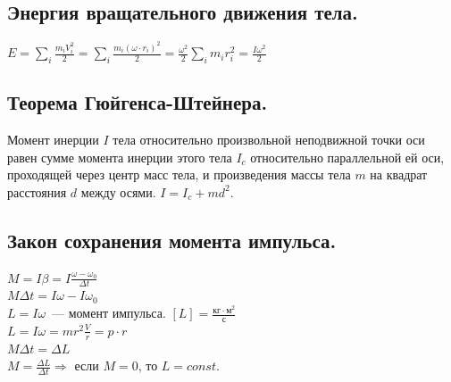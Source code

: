 \documentclass{article}
\begin{document}
	\subsection{Энергия вращательного движения тела.}
	$E = \sum \limits_i \frac{m_iV_i^2}{2} = \sum \limits_i \frac{m_i(\omega \cdot r_i)^2}{2} = \frac{\omega^2}{2} \sum \limits_i m_ir_i^2 = \frac{I\omega^2}{2}$
	\subsection{Теорема Гюйгенса-Штейнера.}
	\begin{theorem}
		Момент инерции $I$ тела относительно произвольной неподвижной точки оси равен сумме момента инерции этого тела $I_c$ относительно параллельной ей оси, проходящей через центр масс тела, и произведения массы тела $m$ на квадрат расстояния $d$ между осями. $I = I_c + md^2$.
	\end{theorem}
	\subsection{Закон сохранения момента импульса.}
	$M = I \beta = I \frac{\omega - \omega_0}{\varDelta t}$ \\
	$M \varDelta t = I \omega - I \omega_0$ \\
	$L = I \omega$~--- момент импульса. $[L] = \frac{\text{кг} \cdot \text{м}^2}{\text{с}}$ \\
	$L = I \omega = m r^2 \frac{V}{r} = p \cdot r$ \\
	$M \varDelta t = \varDelta L$ \\
	$M = \frac{\varDelta L}{\varDelta t} \Rightarrow$ если $M = 0$, то $L = const$.
\end{document}
